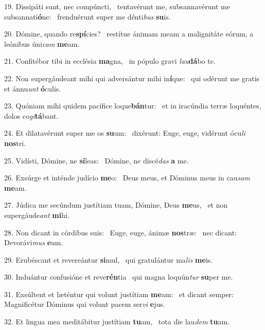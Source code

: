 19. Dissipáti sunt, nec compúncti, \dag\  tentavérunt me, subsannavérunt me subsannati\textbf{ó}ne: \ast\  frenduérunt super me dénti\textit{bus} \textbf{su}is.\

20. Dómine, quando re\textbf{spí}cies? \ast\  restítue ánimam meam a malignitáte eórum, a leónibus úni\textit{cam} \textbf{me}am.\

21. Confitébor tibi in ecclésia \textbf{ma}gna, \ast\  in pópulo gravi \textit{lau}\textbf{dá}bo te.\

22. Non supergáudeant mihi qui adversántur mihi in\textbf{í}que: \ast\  qui odérunt me gratis et ánnu\textit{unt} \textbf{ó}culis.\

23. Quóniam mihi quidem pacífice loque\textbf{bán}tur: \ast\  et in iracúndia terræ loquéntes, dolos co\textit{gi}\textbf{tá}bant.\

24. Et dilatavérunt super me os \textbf{su}um: \ast\  dixérunt: Euge, euge, vidérunt ócu\textit{li} \textbf{nos}tri.\

25. Vidísti, Dómine, ne \textbf{sí}leas: \ast\  Dómine, ne discé\textit{das} \textbf{a} me.\

26. Exsúrge et inténde judício \textbf{me}o: \ast\  Deus meus, et Dóminus meus in cau\textit{sam} \textbf{me}am.\

27. Júdica me secúndum justítiam tuam, Dómine, Deus \textbf{me}us, \ast\  et non supergáude\textit{ant} \textbf{mi}hi.\

28. Non dicant in córdibus suis: \dag\  Euge, euge, ánimæ \textbf{nos}træ: \ast\  nec dicant: Devorávi\textit{mus} \textbf{e}um.\

29. Erubéscant et revereántur \textbf{si}mul, \ast\  qui gratulántur ma\textit{lis} \textbf{me}is.\

30. Induántur confusióne et reve\textbf{rén}tia \ast\  qui magna loquún\textit{tur} \textbf{su}per me.\

31. Exsúltent et læténtur qui volunt justítiam \textbf{me}am: \ast\  et dicant semper: Magnificétur Dóminus qui volunt pacem ser\textit{vi} \textbf{e}jus.\

32. Et lingua mea meditábitur justítiam \textbf{tu}am, \ast\  tota die lau\textit{dem} \textbf{tu}am.\


